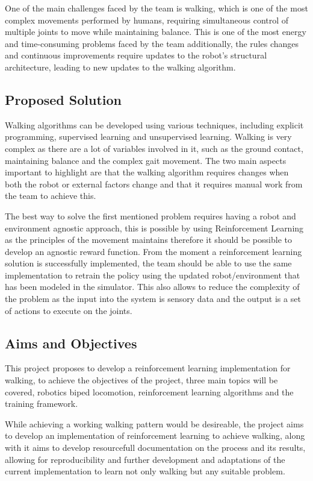         One of the main challenges faced by the team is walking, which is one of the most complex movements performed by humans, requiring simultaneous control of multiple joints to move while maintaining balance. 
        This is one of the most energy and time-consuming problems faced by the team additionally, the rules changes and continuous improvements require updates to the robot's structural architecture, leading to new updates to the walking algorithm.

        \subsection{Proposed Solution}

        Walking algorithms can be developed using various techniques, 
        including explicit programming, supervised learning and unsupervised learning. 
        Walking is very complex as there are a lot of variables involved in it, such as the ground contact, 
        maintaining balance and the complex gait movement. The two main aspects important to highlight are that the walking algorithm requires changes when both the robot or external factors change and that it requires manual work from the team to achieve this. %

        The best way to solve the first mentioned problem requires having a robot and environment agnostic approach, this is possible by using Reinforcement Learning as the principles of the movement maintains therefore it should be possible to develop an agnostic reward function.
        From the moment a reinforcement learning solution is successfully implemented, the team should be able to use the same implementation to retrain the policy using the updated robot/environment that has been modeled in the simulator.
        This also allows to reduce the complexity of the problem as the input into the system is sensory data and the output is a set of actions to execute on the joints.

        \subsection{Aims and Objectives}
        This project proposes to develop a reinforcement learning implementation for walking, 
        to achieve the objectives of the project, three main topics will be covered, 
        robotics biped locomotion, reinforcement learning algorithms and the training framework.

        While achieving a working walking pattern would be desireable, the project aims to develop an implementation of reinforcement learning to achieve walking, 
        along with it aims to develop resourcefull documentation on the process and its results, allowing for reproducibility and further development and 
        adaptations of the current implementation to learn not only walking but any suitable problem.